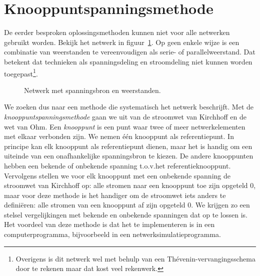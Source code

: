 



\section{Knooppuntspanningsmethode}
De eerder besproken oplossingsmethoden kunnen niet voor alle netwerken gebruikt worden. Bekijk het netwerk in figuur~\ref{fig:gelnetwerkvoornodalanalysis}. Op geen enkele wijze is een combinatie van weerstanden te vereenvoudigen als serie- of parallelweerstand. Dat betekent dat technieken als spanningsdeling en stroomdeling niet kunnen worden toegepast\footnote{Overigens is dit netwerk wel met behulp van een Thévenin-vervangingsschema door te rekenen maar dat kost veel rekenwerk.}.

\begin{figure}[!ht]
\centering
{}
\caption{Netwerk met spanningsbron en weerstanden.}
\label{fig:gelnetwerkvoornodalanalysis}
\end{figure}

We zoeken dus naar een methode die systematisch het netwerk beschrijft. Met de \textsl{knooppuntspanningsmethode} gaan we uit van de stroomwet van Kirchhoff en de wet van Ohm. Een \textsl{knooppunt} is een punt waar twee of meer netwerkelementen met elkaar verbonden zijn. We nemen één knooppunt als referentiepunt. In principe kan elk knooppunt als referentiepunt dienen, maar het is handig om een uiteinde van een onafhankelijke spanningsbron te kiezen. De andere knooppunten hebben een bekende of onbekende spanning t.o.v.\@ het referentieknooppunt. Vervolgens stellen we voor elk knooppunt met een onbekende spanning de stroomwet van Kirchhoff op: alle stromen naar een knooppunt toe zijn opgeteld 0, maar voor deze methode is het handiger om de stroomwet iets anders te definiëren: alle stromen van een knooppunt af zijn opgeteld 0. We krijgen zo een stelsel vergelijkingen met bekende en onbekende spanningen dat op te lossen is. Het voordeel van deze methode is dat het te implementeren is in een computerprogramma, bijvoorbeeld in een netwerksimulatieprogramma.

